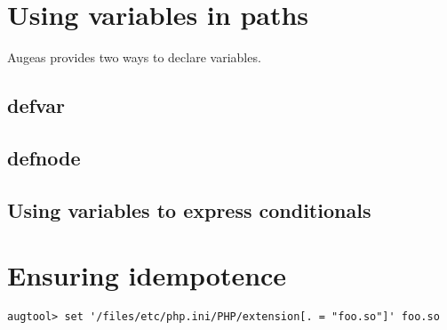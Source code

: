 \section{Using variables in paths}

\label{sec:variables} 

Augeas provides two ways to declare variables.

\subsection{defvar}

 

\subsection{defnode}

 


\subsection{Using variables to express conditionals}

\section{Ensuring idempotence}

\label{sec:ensuring_idempotence} 

\begin{verbatim}
augtool> set '/files/etc/php.ini/PHP/extension[. = "foo.so"]' foo.so
\end{verbatim}

